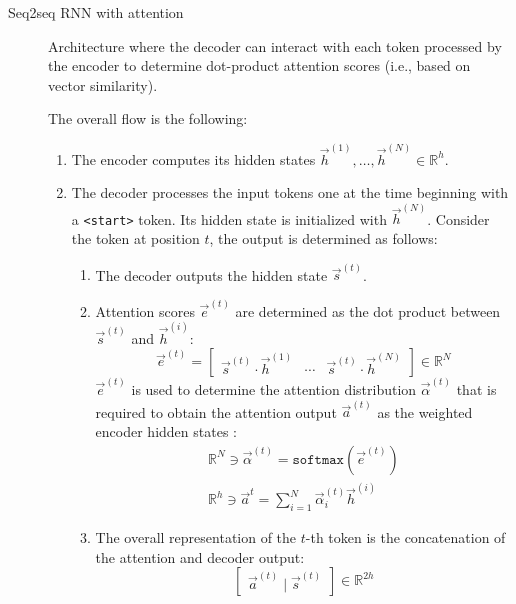 \begin{description}
    \item[Seq2seq RNN with attention] 
        Architecture where the decoder can interact with each token processed by the encoder to determine dot-product attention scores (i.e., based on vector similarity).

        The overall flow is the following:
        \begin{enumerate}
            \item The encoder computes its hidden states $\vec{h}^{(1)}, \dots, \vec{h}^{(N)} \in \mathbb{R}^{h}$.
            \item The decoder processes the input tokens one at the time beginning with a \texttt{<start>} token. Its hidden state is initialized with $\vec{h}^{(N)}$. Consider the token at position $t$, the output is determined as follows:
            \begin{enumerate}
                \item The decoder outputs the hidden state $\vec{s}^{(t)}$.
                \item Attention scores $\vec{e}^{(t)}$ are determined as the dot product between $\vec{s}^{(t)}$ and $\vec{h}^{(i)}$:
                \[ 
                    \vec{e}^{(t)} = 
                        \begin{bmatrix}
                            \vec{s}^{(t)} \cdot \vec{h}^{(1)} & 
                            \cdots &
                            \vec{s}^{(t)} \cdot \vec{h}^{(N)} 
                        \end{bmatrix} \in \mathbb{R}^{N} 
                \]
                $\vec{e}^{(t)}$ is used to determine the attention distribution $\vec{\alpha}^{(t)}$ that is required to obtain the attention output $\vec{a}^{(t)}$ as the weighted encoder hidden states :
                \[
                    \begin{gathered}
                        \mathbb{R}^{N} \ni \vec{\alpha}^{(t)} = \texttt{softmax}(\vec{e}^{(t)}) \\
                        \mathbb{R}^{h} \ni \vec{a}^{t} = \sum_{i=1}^{N} \vec{\alpha}^{(t)}_i \vec{h}^{(i)}
                    \end{gathered}
                \]
                \item The overall representation of the $t$-th token is the concatenation of the attention and decoder output:
                \[ \begin{bmatrix} \vec{a}^{(t)} \mid \vec{s}^{(t)} \end{bmatrix} \in \mathbb{R}^{2h} \]
            \end{enumerate}
        \end{enumerate}


\end{description}
